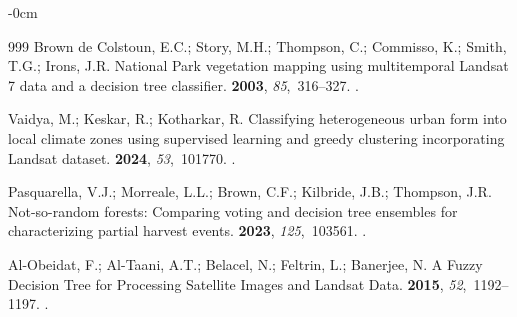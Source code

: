\documentclass[coasts,article,accept,pdftex,oneauthor]{Definitions/mdpi}
\begin{document}
\begin{adjustwidth}{-\extralength}{0cm}
\begin{thebibliography}{999}
{Brown de Colstoun}, E.C.; Story, M.H.; Thompson, C.; Commisso, K.; Smith,
  T.G.; Irons, J.R.
\newblock National Park vegetation mapping using multitemporal Landsat 7 data
  and a decision tree classifier.
 {\bf 2003}, {\em 85},~316--327.
.

Vaidya, M.; Keskar, R.; Kotharkar, R.
\newblock Classifying heterogeneous urban form into local climate zones using
  supervised learning and greedy clustering incorporating Landsat dataset.
 {\bf 2024}, {\em 53},~101770.
.

Pasquarella, V.J.; Morreale, L.L.; Brown, C.F.; Kilbride, J.B.; Thompson, J.R.
\newblock Not-so-random forests: Comparing voting and decision tree ensembles
  for characterizing partial harvest events.
 {\bf 2023}, {\em 125},~103561.
.

Al-Obeidat, F.; Al-Taani, A.T.; Belacel, N.; Feltrin, L.; Banerjee, N.
\newblock A Fuzzy Decision Tree for Processing Satellite Images and Landsat
  Data.
 {\bf 2015}, {\em 52},~1192--1197.
.

\end{thebibliography}


\end{adjustwidth}
\end{document}
